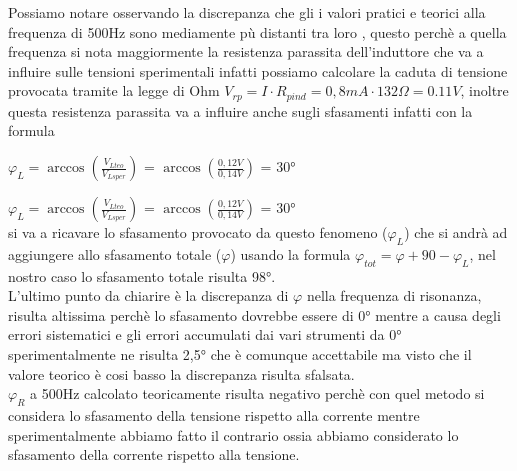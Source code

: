 \documentclass[12pt]{article}
\begin{document}
Possiamo notare osservando la discrepanza che gli i valori pratici e teorici alla frequenza di 500Hz sono mediamente pù distanti tra loro 
, questo perchè a quella frequenza si nota maggiormente la resistenza parassita dell'induttore che va a influire sulle tensioni sperimentali infatti possiamo 
calcolare la caduta di tensione provocata tramite la legge di Ohm $V_{rp}=I\cdot R_{pind}=0,8mA \cdot 132 \Omega=0.11V$, inoltre questa resistenza parassita va a influire anche sugli sfasamenti
infatti con la formula\\ 
\begin{center}
$\varphi_L=\arccos(\frac{V_{Lteo}}{V_{Lsper}})$ = $\arccos(\frac{0,12V}{0,14V})$ = 30°\\
    
\end{center}
$\varphi_L=\arccos(\frac{V_{Lteo}}{V_{Lsper}})$ = $\arccos(\frac{0,12V}{0,14V})$ = 30°\\
si va a ricavare lo sfasamento provocato da questo fenomeno ($\varphi_L$) che si andrà ad aggiungere allo sfasamento totale ($\varphi$) usando la formula $\varphi_{tot}=\varphi+90-\varphi_L$, nel nostro caso lo sfasamento totale risulta 98°.\\
L'ultimo punto da chiarire è la discrepanza di $\varphi$ nella frequenza di risonanza, risulta altissima perchè lo sfasamento dovrebbe essere di 0° mentre 
a causa degli errori sistematici e gli errori accumulati dai vari strumenti da 0° sperimentalmente ne risulta 2,5° che è comunque accettabile ma visto che il valore teorico è cosi basso la discrepanza risulta sfalsata.\\
$\varphi_R$ a 500Hz calcolato teoricamente risulta negativo perchè con quel metodo si considera lo sfasamento della tensione rispetto alla corrente mentre sperimentalmente abbiamo fatto il contrario ossia abbiamo considerato lo sfasamento della corrente rispetto 
alla tensione.\\
\end{document}
